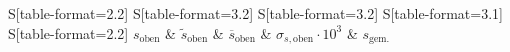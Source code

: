 \begin{table}
    \centering
    \caption{Berechnete Abstände der Löcher $s_\text{oben}, \tilde{s}_\text{oben}$ zur unteren Kante, ihr Mittelwert $\overline{s}_\text{oben}$ mit dem Fehler $\sigma_{s,\text{oben}}$ und der gemessene Wert $s_\text{gem.}$, alle Werte in \si{\milli\meter}}
    \label{tab:ObenGanz}
    \begin{tabular}{
	S[table-format=2.2]
	S[table-format=3.2]
	S[table-format=3.2]
	S[table-format=3.1]
	S[table-format=2.2]
	}
	\toprule
	{$s_\text{oben}$}		& {$\tilde{s}_\text{oben}$}		& 
	{$\overline{s}_\text{oben}$}		& {$\sigma_{s,\text{oben}}\cdot 10^3$}		& 
	{$s_\text{gem.}$}		\\ 
	\midrule
    
    \bottomrule
    \end{tabular}
    \end{table}
